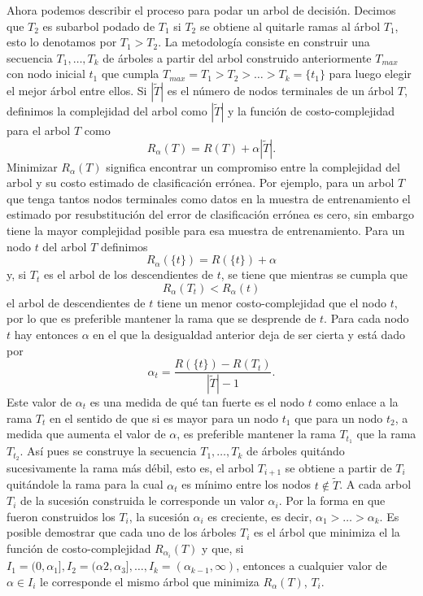 \documentclass[letterpaper,12pt]{book}
\begin{document}
Ahora podemos describir el proceso para podar un arbol de decisión. Decimos que  $T_2$ es subarbol podado de $T_1$ si $T_2$ se obtiene al quitarle ramas al árbol $T_1$, esto lo denotamos por $T_1>T_2$. La metodología consiste en construir una secuencia $T_1,\dots,T_k$ de árboles a partir del arbol construido anteriormente $T_{max}$ con nodo inicial $t_1$ que cumpla $T_{max} = T_1>T_2>\dots>T_{k}=\{t_1\}$ para luego elegir el mejor árbol entre ellos. Si $|\widetilde{T}|$ es el número de nodos terminales de un árbol $T$, definimos la complejidad del arbol como $|\widetilde{T}|$ y la función de costo-complejidad para el arbol $T$ como
\begin{equation}
R_{\alpha}(T) = R(T)+\alpha|\tilde{T}|.
\end{equation}
Minimizar $R_{\alpha}(T)$ significa encontrar un compromiso entre la complejidad del arbol y su costo estimado de clasificación errónea. Por ejemplo, para un arbol $T$ que tenga tantos nodos terminales como datos en la muestra de entrenamiento el estimado por resubstitución del error de clasificación errónea es cero, sin embargo tiene la mayor complejidad posible para esa muestra de entrenamiento. Para un nodo $t$ del arbol $T$ definimos
\begin{equation}
R_{\alpha}(\{t\}) = R(\{t\})+\alpha
\end{equation}
y, si $T_t$ es el arbol de los descendientes de $t$, se tiene que mientras se cumpla que
\begin{equation}
R_{\alpha}(T_{t}) < R_{\alpha}(t)
\end{equation}
el arbol de descendientes de $t$ tiene un menor costo-complejidad que el nodo $t$, por lo que es preferible mantener la rama que se desprende de $t$. Para cada nodo $t$ hay entonces $\alpha$ en el que la desigualdad anterior deja de ser cierta y está dado por
\begin{equation}
\alpha_t = \frac{R(\{t\})-R(T_t)}{|\tilde{T}|-1}. 
\end{equation} 
Este valor de $\alpha_t$ es una medida de qué tan fuerte es el nodo $t$ como enlace a la rama $T_t$ en el sentido de que si es mayor para un nodo $t_1$ que para un nodo $t_2$, a medida que aumenta el valor de $\alpha$, es preferible mantener la rama $T_{t_1}$ que la rama $T_{t_2}$. Así pues se construye la secuencia $T_1,\dots,T_k$ de árboles quitándo sucesivamente la rama más débil, esto es, el arbol $T_{i+1}$ se obtiene a partir de $T_{i}$ quitándole la rama para la cual $\alpha_t$ es mínimo entre los nodos $t\notin \widetilde{T}$. A cada arbol $T_i$ de la sucesión construida le corresponde un valor $\alpha_i$. Por la forma en que fueron construidos los $T_i$, la sucesión $\alpha_i$ es creciente, es decir, $\alpha_1>\dots>\alpha_k$. Es posible demostrar que cada uno de los árboles $T_i$ es el árbol que minimiza el la función de costo-complejidad  $R_{\alpha_i}(T)$ y que, si $I_1 = (0,\alpha_1],I_2 =(\alpha2,\alpha_3],\dots,I_k=(\alpha_{k-1},\infty)$, entonces a cualquier valor de $\alpha\in I_i$ le corresponde el mismo árbol que minimiza $R_\alpha(T)$, $T_i$.
\end{document}
